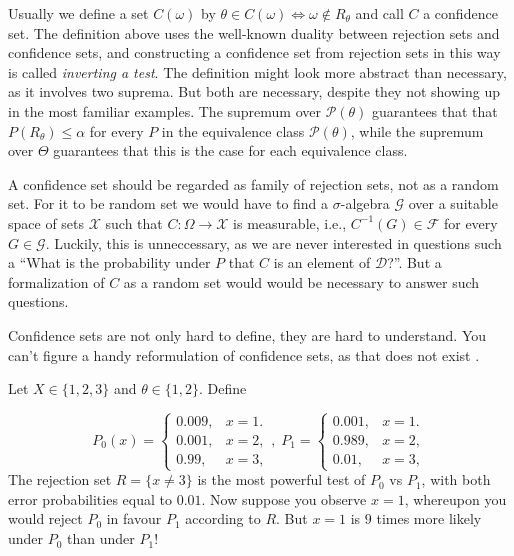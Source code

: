 Usually we define a set $C(\omega)$ by $\theta\in C(\omega)\iff\omega\notin R_{\theta}$ and call $C$ a confidence set. The definition above uses the well-known duality between rejection sets and confidence sets, and constructing a confidence set from rejection sets in this way is called
\emph{inverting a test}. The definition might look more abstract than necessary, as it involves two suprema. But both are necessary, despite they not showing up in the most familiar examples. The supremum over $\mathcal{P}(\theta)$ guarantees that that $P(R_{\theta})\leq\alpha$
for every $P$ in the equivalence class $\mathcal{P}(\theta)$, while
the supremum over $\Theta$ guarantees that this is the case for each equivalence class.

A confidence set should be regarded as family of rejection sets, not
as a random set. For it to be random set we would have to find a $\sigma$-algebra
$\mathcal{G}$ over a suitable space of sets $\mathcal{X}$ such that
$C:\Omega\to\mathcal{X}$ is measurable, i.e., $C^{-1}(G)\in\mathcal{F}$
for every $G\in\mathcal{G}$. Luckily, this is unneccessary, as we
are never interested in questions such a ``What is the probability
under $P$ that $C$ is an element of $\mathcal{D}$?''. But a formalization
of $C$ as a random set would would be necessary to answer such questions.

Confidence sets are not only hard to define, they are hard to understand.
You can't figure a handy reformulation of confidence sets, as that
does not exist \parencite{Morey2016-ry}. 
\begin{example}
 Let $X\in\{1,2,3\}$ and $\theta\in\{1,2\}$. Define

\[
P_{0}(x)=\begin{cases}
0.009, & x=1.\\
0.001, & x=2,\\
0.99, & x=3,
\end{cases},\;P_{1}=\begin{cases}
0.001, & x=1.\\
0.989, & x=2,\\
0.01, & x=3,
\end{cases}
\]
The rejection set $R=\{x\neq3\}$ is the most powerful test of $P_{0}$
vs $P_{1}$, with both error probabilities equal to $0.01$. Now suppose
you observe $x=1$, whereupon you would reject $P_{0}$ in favour
$P_{1}$ according to $R$. But $x=1$ is $9$ times more likely under
$P_{0}$ than under $P_{1}$!
\end{example}

